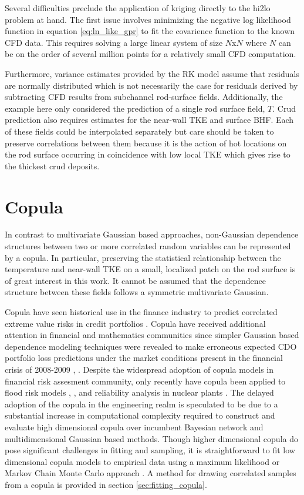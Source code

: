 Several difficulties preclude the application of kriging directly to the hi2lo problem at hand.  The first issue involves  minimizing the negative log likelihood function in equation \ref{eq:ln_like_gpr} to fit the covarience function to the known CFD data.  This requires solving a large linear system of size $N$x$N$ where $N$ can be on the order of several million points for a relatively small CFD computation.  

Furthermore, variance estimates provided by the RK model assume that residuals are normally distributed which is not necessarily the case for residuals derived by subtracting CFD results from subchannel rod-surface fields.  Additionally, the example here only considered the prediction of a single rod surface field, $T$.  Crud prediction also requires estimates for the near-wall TKE and surface BHF.  Each of these fields could be interpolated separately but care should be taken to preserve correlations between them because it is the action of hot locations on the rod surface occurring in coincidence with low local TKE which gives rise to the thickest crud deposits.  


\section{Copula}

In contrast to multivariate Gaussian based approaches, non-Gaussian dependence structures between two or more correlated random variables can be represented by a copula.  In particular, preserving the statistical relationship between the temperature and near-wall TKE on a small, localized patch on the rod surface is of great interest in this work.  It cannot be assumed that the dependence structure between these fields follows a symmetric multivariate Gaussian.

Copula have seen historical use in the finance industry to
predict correlated extreme value risks in credit portfolios
\cite{Geidosch2016}.  Copula have received additional attention in financial and mathematics communities since 
simpler Gaussian based dependence modeling techniques were revealed to make erroneous expected CDO portfolio loss predictions under the market conditions present in the financial crisis of
2008-2009 \cite{MacKenzie2013}, \cite{Li2000}.  Despite the widespread adoption of copula models in financial risk assesment community, only recently have copula been applied to flood risk
models \cite{Dupuis2007}, \cite{Ganguli2012}, and reliability analysis in nuclear plants
\cite{Kelly2007}.  The delayed adoption of the copula in the
engineering realm is speculated to be due to a substantial increase in computational
complexity required to construct and evaluate high dimensional copula over
incumbent Bayesian network and multidimensional Gaussian based methods.  
Though higher dimensional copula do pose significant challenges in fitting and sampling, it is straightforward to fit low dimensional copula models to empirical data
using a maximum likelihood or Markov Chain Monte Carlo approach \cite{Jouini1996}.
A method for drawing correlated samples from a copula is provided in section \ref{sec:fitting_copula}.
